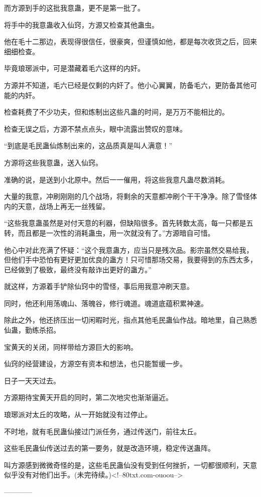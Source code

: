 \begin{this_body}
而方源到手的这批我意蛊，更不是第一批了。

将手中的我意蛊收入仙窍，方源又检查其他蛊虫。

他在毛十二那边，表现得很信任，很豪爽，但谨慎如他，都是每次收货之后，回来细细检查。

毕竟琅琊派中，可是潜藏着毛六这样的内奸。

方源并不知道，毛六已经是仅剩的内奸了。他小心翼翼，防备毛六，更防备其他可能的内奸。

检查耗费了不少功夫，但和炼制出这些凡蛊的时间，是万万不能相比的。

检查无误之后，方源不禁点点头，眼中流露出赞叹的意味。

“到底是毛民蛊仙炼制出来的，这品质真是叫人满意！”

方源将这些我意蛊，送入仙窍。

准确的说，是送到小北原中。然后一一催用，将这些我意凡蛊尽数消耗。

大量的我意，冲刷刚刚的几个战场，将剩余的天意都冲刷个干干净净。除了雪怪体内的天意，战场上再无一丝残留。

“这些我意蛊虽然是对付天意的利器，但缺陷很多。首先转数太高，每一只都是五转，而且都是一次性的消耗蛊虫，用一次就没有了。”方源暗自可惜。

他心中对此充满了怀疑：“这个我意蛊方，应当只是残次品。影宗虽然交易给我，但他们手中恐怕有更好更加优良的蛊方！只可惜那场交易，我要得到的东西太多，已经做到了极致，最终没有敲诈出更好的蛊方。”

就这样，方源着手铲除仙窍中的雪怪，事后用我意冲刷天意。

同时，他还利用荡魂山、落魄谷，修行魂道。魂道底蕴积累神速。

除此之外，他还挤压出一切闲暇时光，指点其他毛民蛊仙作战。暗地里，自己熟悉仙蛊，勤练杀招。

宝黄天的关闭，同样带给方源巨大的影响。

仙窍的经营建设，方源空有资本和想法，也只能暂缓一步。

日子一天天过去。

方源期待宝黄天开启的同时，第二次地灾也渐渐逼近。

琅琊派对太丘的攻略，从一开始就没有过停止。

不时地，就有毛民蛊仙接过门派任务，通过传送门，前往太丘。

这些毛民蛊仙传送过去的第一要务，就是改造环境，稳定传送蛊阵。

叫方源感到微微奇怪的是，这些毛民蛊仙没有受到任何挫折，一切都很顺利，天意似乎没有对他们出手。(未完待续。)<!--80txt.com-ouoou-->

------------

\end{this_body}

